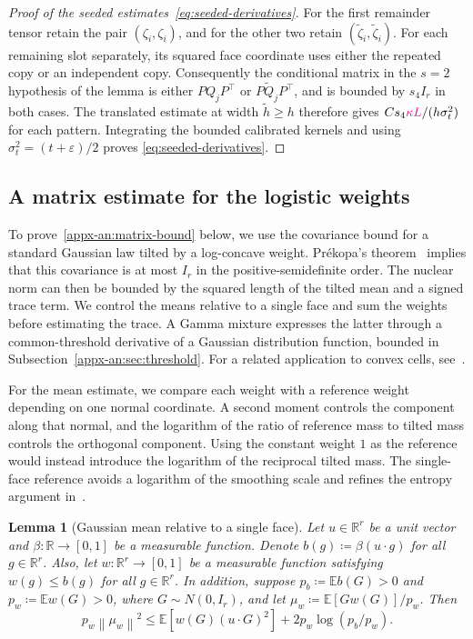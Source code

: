 \documentclass[11pt,letterpaper]{article}
\newcommand{\vSix}[1]{{\color{magenta}#1}}
\newtheorem{lemma}{Lemma}
\theoremstyle{remark}
\newcommand{\E}{\mathbb E}
\newcommand{\R}{\mathbb R}
\newcommand{\norm}[1]{\left\lVert#1\right\rVert}
\begin{document}
\begin{proof}[Proof of the seeded estimates~\eqref{eq:seeded-derivatives}]
For the first remainder tensor retain the pair $(\zeta_i,\zeta_i)$, and for the other two retain $(\widetilde\zeta_i,\widetilde\zeta_i)$. For each remaining slot separately, its squared face coordinate uses either the repeated copy or an independent copy. Consequently the conditional matrix in the $s=2$ hypothesis of the lemma is either $P Q_jP^\top$ or $P\widetilde Q_jP^\top$, and is bounded by $s_4 I_r$ in both cases. The translated estimate at width $\widetilde h\ge h$ therefore gives $Cs_4\vSix{\kappa L}/(h\sigma_t^2)$ for each pattern. Integrating the bounded calibrated kernels and using $\sigma_t^2=(t+\varepsilon)/2$ proves \eqref{eq:seeded-derivatives}.

\end{proof}

\subsection{A matrix estimate for the logistic weights}
\label{appx-an:sec:matrix}

{To prove~\eqref{appx-an:matrix-bound} below, we use the covariance bound for}
a standard Gaussian law tilted by a log-concave weight. Pr\'ekopa's
theorem~\cite[Theorem~6]{Prekopa1973} implies that this covariance is
at most \(I_r\) in the positive-semidefinite order. The nuclear norm
can then be bounded by the squared length of the tilted mean and a
signed trace term. We control the means relative to a single face and sum the
weights before estimating the trace. A Gamma mixture expresses the
latter through a common-threshold derivative of a Gaussian distribution
function, bounded in Subsection~\ref{appx-an:sec:threshold}.
For a related application to convex cells,
see~\cite[Lemma~12]{GaoZhang}.

For the mean estimate, we compare each weight with a reference weight
depending on one normal coordinate. A second moment controls the
component along that normal, and the logarithm of the ratio of
reference mass to tilted mass controls the orthogonal component.
Using the constant weight \(1\) as the reference would instead introduce
the logarithm of the reciprocal tilted mass. The single-face reference
avoids a logarithm of the smoothing scale and refines the entropy argument
in~\cite[Lemma~12]{GaoZhang}.

\begin{lemma}[Gaussian mean relative to a single face]
\label{appx-an:lem:mean}
Let \(u\in\R^r\) be a unit vector and
\(\beta:\R\to[0,1]\) be a measurable function. Denote
\(b(g)\coloneqq\beta(u\cdot g)\) for all \(g\in\R^r\).
Also, let \(w:\R^r\to[0,1]\) be a measurable function
satisfying \(w(g)\le b(g)\) for all $g\in\R^r$.
In addition, suppose \(p_b\coloneqq\E b(G)>0\) and
\(p_w\coloneqq\E w(G)>0\), where \(G\sim N(0,I_r)\),
and let \(\mu_w\coloneqq\E[Gw(G)]/p_w\). Then
\begin{equation}
 p_w\norm{\mu_w}^2
 \le \E[w(G)(u\cdot G)^2]
        +2p_w\log(p_b/p_w).
 \label{appx-an:mean-entropy}
\end{equation}
\end{lemma}
\end{document}
